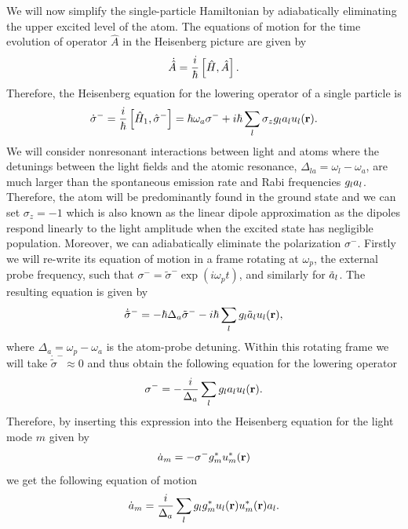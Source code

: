 We will now simplify the single-particle Hamiltonian by adiabatically
eliminating the upper excited level of the atom. The equations of
motion for the time evolution of operator $\hat{A}$ in the Heisenberg
picture are given by
\begin{equation}
  \dot{\hat{A}} = \frac{i}{\hbar} \left[\hat{H}, \hat{A} \right].
\end{equation}
Therefore, the Heisenberg equation for the lowering operator of a
single particle is
\begin{equation}
  \dot{\sigma}^- = \frac{i}{\hbar} \left[\hat{H}_1, \hat{\sigma}^- \right]
  = \hbar \omega_a \sigma^- + i \hbar \sum_l \sigma_z g_l a_l u_l(\mathbf{r}).
\end{equation}
We will consider nonresonant interactions between light and atoms
where the detunings between the light fields and the atomic resonance,
$\Delta_{la} = \omega_l - \omega_a$, are much larger than the
spontaneous emission rate and Rabi frequencies $g_l a_l$. Therefore,
the atom will be predominantly found in the ground state and we can
set $\sigma_z = -1$ which is also known as the linear dipole
approximation as the dipoles respond linearly to the light amplitude
when the excited state has negligible population. Moreover, we can
adiabatically eliminate the polarization $\sigma^-$. Firstly we will
re-write its equation of motion in a frame rotating at $\omega_p$, the
external probe frequency, such that
$\sigma^- = \tilde{\sigma}^- \exp(i \omega_p t)$, and similarly for
$\tilde{a}_l$. The resulting equation is given by
\begin{equation}
  \dot{\tilde{\sigma}}^- = - \hbar \Delta_a \tilde{\sigma}^- - i \hbar
  \sum_l g_l \tilde{a}_l u_l(\mathbf{r}),
\end{equation}
where $\Delta_a = \omega_p - \omega_a$ is the atom-probe
detuning. Within this rotating frame we will take
$\dot{\tilde{\sigma}}^- \approx 0$ and thus obtain the following
equation for the lowering operator
\begin{equation}
  \sigma^- = - \frac{i}{\Delta_a} \sum_l g_l a_l u_l(\mathbf{r}).
\end{equation}
Therefore, by inserting this expression into the Heisenberg equation
for the light mode $m$ given by
\begin{equation}
  \dot{a}_m = - \sigma^- g^*_m u^*_m(\mathbf{r})
\end{equation}
we get the following equation of motion
\begin{equation}
  \dot{a}_m = \frac{i}{\Delta_a} \sum_l g_l g^*_m u_l(\mathbf{r})
  u^*_m(\mathbf{r}) a_l.
\end{equation}
